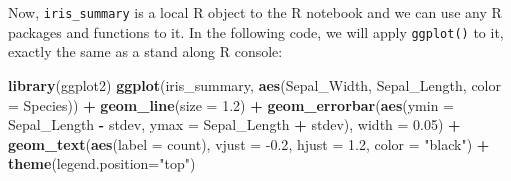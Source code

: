\documentclass[12pt,]{krantz}
\makeatletter
\newenvironment{Shaded}{\begin{snugshade}}{\end{snugshade}}
\newcommand{\DataTypeTok}[1]{\textcolor[rgb]{0.27,0.27,0.27}{#1}}
\newcommand{\DecValTok}[1]{\textcolor[rgb]{0.06,0.06,0.06}{#1}}
\newcommand{\FloatTok}[1]{\textcolor[rgb]{0.06,0.06,0.06}{#1}}
\newcommand{\KeywordTok}[1]{\textcolor[rgb]{0.27,0.27,0.27}{\textbf{#1}}}
\newcommand{\NormalTok}[1]{#1}
\newcommand{\OperatorTok}[1]{\textcolor[rgb]{0.43,0.43,0.43}{\textbf{#1}}}
\newcommand{\StringTok}[1]{\textcolor[rgb]{0.5,0.5,0.5}{#1}}
\newenvironment{kframe}{%
\medskip{}
\setlength{\fboxsep}{.8em}
 \def\at@end@of@kframe{}%
 \ifinner\ifhmode%
  \def\at@end@of@kframe{\end{minipage}}%
  \begin{minipage}{\columnwidth}%
 \fi\fi%
 \def\FrameCommand##1{\hskip\@totalleftmargin \hskip-\fboxsep
 \colorbox{shadecolor}{##1}\hskip-\fboxsep
     \hskip-\linewidth \hskip-\@totalleftmargin \hskip\columnwidth}%
 \MakeFramed {\advance\hsize-\width
   \@totalleftmargin\z@ \linewidth\hsize
   \@setminipage}}%
 {\par\unskip\endMakeFramed%
 \at@end@of@kframe}
\renewenvironment{Shaded}{\begin{kframe}}{\end{kframe}}
\makeatother
\begin{document}
\begin{Shaded}
\end{Shaded}

Now, \texttt{iris\_summary} is a local R object to the R notebook and we can use any R packages and functions to it. In the following code, we will apply \texttt{ggplot()} to it, exactly the same as a stand along R console:

\begin{Shaded}
\begin{Highlighting}[]
\KeywordTok{library}\NormalTok{(ggplot2)}
\KeywordTok{ggplot}\NormalTok{(iris_summary, }\KeywordTok{aes}\NormalTok{(Sepal_Width, Sepal_Length, }
                         \DataTypeTok{color =}\NormalTok{ Species)) }\OperatorTok{+}
\StringTok{  }\KeywordTok{geom_line}\NormalTok{(}\DataTypeTok{size =} \FloatTok{1.2}\NormalTok{) }\OperatorTok{+}
\StringTok{  }\KeywordTok{geom_errorbar}\NormalTok{(}\KeywordTok{aes}\NormalTok{(}\DataTypeTok{ymin =}\NormalTok{ Sepal_Length }\OperatorTok{-}\StringTok{ }\NormalTok{stdev, }
                    \DataTypeTok{ymax =}\NormalTok{ Sepal_Length }\OperatorTok{+}\StringTok{ }\NormalTok{stdev), }
                    \DataTypeTok{width =} \FloatTok{0.05}\NormalTok{) }\OperatorTok{+}
\StringTok{  }\KeywordTok{geom_text}\NormalTok{(}\KeywordTok{aes}\NormalTok{(}\DataTypeTok{label =}\NormalTok{ count), }\DataTypeTok{vjust =} \FloatTok{-0.2}\NormalTok{, }\DataTypeTok{hjust =} \FloatTok{1.2}\NormalTok{, }
            \DataTypeTok{color =} \StringTok{"black"}\NormalTok{) }\OperatorTok{+}
\StringTok{  }\KeywordTok{theme}\NormalTok{(}\DataTypeTok{legend.position=}\StringTok{"top"}\NormalTok{)}
\end{Highlighting}
\end{Shaded}
\end{document}
